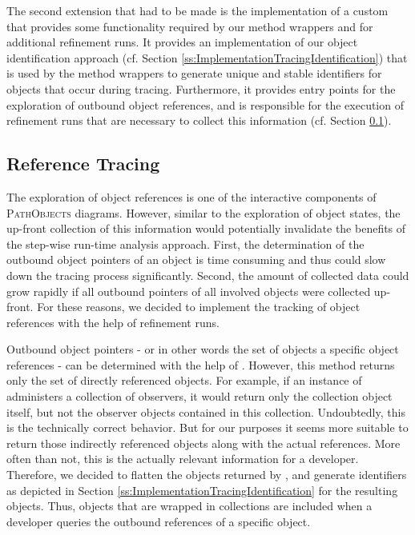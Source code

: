 The second extension that had to be made is the implementation of a custom  that provides some functionality required by our method wrappers and for additional refinement runs.
It provides an implementation of our object identification approach (cf. Section \ref{ss:ImplementationTracingIdentification}) that is used by the method wrappers to generate unique and stable identifiers for objects that occur during tracing.
Furthermore, it provides entry points for the exploration of outbound object references, and is responsible for the execution of refinement runs that are necessary to collect this information (cf. Section \ref{ss:ImplementationTracingReferences}).

\subsection{Reference Tracing}
\label{ss:ImplementationTracingReferences}
The exploration of object references is one of the interactive components of \textsc{PathObjects} diagrams.
However, similar to the exploration of object states, the up-front collection of this information would potentially invalidate the benefits of the step-wise run-time analysis approach.
First, the determination of the outbound object pointers of an object is time consuming and thus could slow down the tracing process significantly.
Second, the amount of collected data could grow rapidly if all outbound pointers of all involved objects were collected up-front.
For these reasons, we decided to implement the tracking of object references with the help of refinement runs.

Outbound object pointers - or in other words the set of objects a specific object references - can be determined with the help of  .
However, this method returns only the set of directly referenced objects.
For example, if an instance of  administers a collection of observers, it would return only the collection object itself, but not the observer objects contained in this collection.
Undoubtedly, this is the technically correct behavior.
But for our purposes it seems more suitable to return those indirectly referenced objects along with the actual references. 
More often than not, this is the actually relevant information for a developer.
Therefore, we decided to flatten the objects returned by , and generate identifiers as depicted in Section \ref{ss:ImplementationTracingIdentification} for the resulting objects.
Thus, objects that are wrapped in collections are included when a developer queries the outbound references of a specific object.


